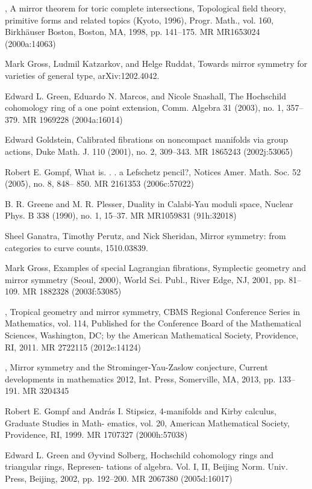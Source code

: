 {\begin{list}{}{%
  \setlength{\leftmargin}{3.4em}%
  \setlength{\itemindent}{-3.4em}%
  \setlength{\itemsep}{1.5pt}%
  \setlength{\parsep}{0pt}%
  \setlength{\listparindent}{0pt}%
}
\item[{[Giv98]}] , A mirror theorem for toric complete intersections, Topological field theory, primitive forms and related topics (Kyoto, 1996), Progr. Math., vol. 160, Birkhäuser Boston, Boston, MA, 1998, pp. 141--175. MR MR1653024 (2000a:14063)
\item[{[GKR]}] Mark Gross, Ludmil Katzarkov, and Helge Ruddat, Towards mirror symmetry for varieties of general type, arXiv:1202.4042.
\item[{[GMS03]}] Edward L. Green, Eduardo N. Marcos, and Nicole Snashall, The Hochschild cohomology ring of a one point extension, Comm. Algebra 31 (2003), no. 1, 357--379. MR 1969228 (2004a:16014)
\item[{[Gol01]}] Edward Goldstein, Calibrated fibrations on noncompact manifolds via group actions, Duke Math. J. 110 (2001), no. 2, 309--343. MR 1865243 (2002j:53065)
\item[{[Gom05]}] Robert E. Gompf, What is. . . a Lefschetz pencil?, Notices Amer. Math. Soc. 52 (2005), no. 8, 848-- 850. MR 2161353 (2006c:57022)
\item[{[GP90]}] B. R. Greene and M. R. Plesser, Duality in Calabi-Yau moduli space, Nuclear Phys. B 338 (1990), no. 1, 15--37. MR MR1059831 (91h:32018)
\item[{[GPS]}] Sheel Ganatra, Timothy Perutz, and Nick Sheridan, Mirror symmetry: from categories to curve counts, 1510.03839.
\item[{[Gro01]}] Mark Gross, Examples of special Lagrangian fibrations, Symplectic geometry and mirror symmetry (Seoul, 2000), World Sci. Publ., River Edge, NJ, 2001, pp. 81--109. MR 1882328 (2003f:53085)
\item[{[Gro11]}] , Tropical geometry and mirror symmetry, CBMS Regional Conference Series in Mathematics, vol. 114, Published for the Conference Board of the Mathematical Sciences, Washington, DC; by the American Mathematical Society, Providence, RI, 2011. MR 2722115 (2012e:14124)
\item[{[Gro13]}] , Mirror symmetry and the Strominger-Yau-Zaslow conjecture, Current developments in mathematics 2012, Int. Press, Somerville, MA, 2013, pp. 133--191. MR 3204345
\item[{[GS99]}] Robert E. Gompf and András I. Stipsicz, 4-manifolds and Kirby calculus, Graduate Studies in Math- ematics, vol. 20, American Mathematical Society, Providence, RI, 1999. MR 1707327 (2000h:57038)
\item[{[GS02]}] Edward L. Green and Øyvind Solberg, Hochschild cohomology rings and triangular rings, Represen- tations of algebra. Vol. I, II, Beijing Norm. Univ. Press, Beijing, 2002, pp. 192--200. MR 2067380 (2005d:16017)

\end{list}}
